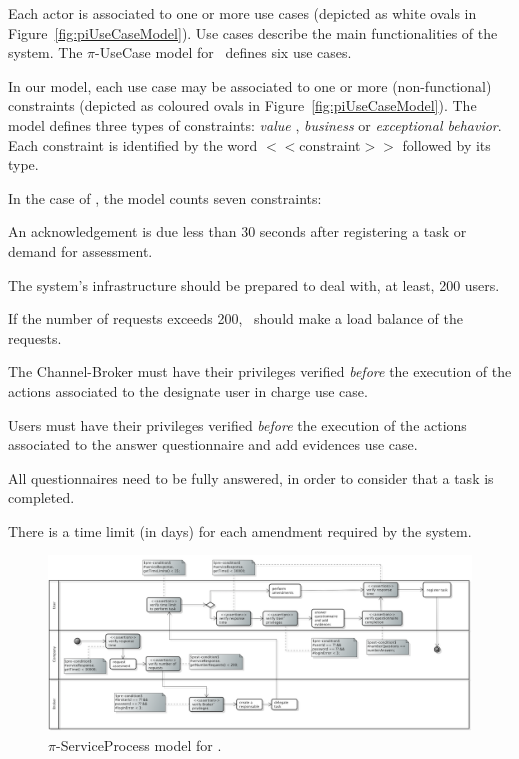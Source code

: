 Each actor is associated to one or more use cases (depicted as white ovals in Figure~\ref{fig:piUseCaseModel}). 
Use cases describe the main functionalities of the system.
The $\pi$-UseCase model for \FlyingPig\ defines six use cases. 

In our model, each use case may be associated to one or more (non-functional) constraints (depicted as coloured ovals in Figure~\ref{fig:piUseCaseModel}). 
The model defines three types of constraints: \textit{value} , \textit{business} or \textit{exceptional behavior}. 
Each constraint is identified by the word $<<$\textsf{constraint}$>>$ followed by its type.

In the case of \FlyingPig, the model counts seven constraints:
\begin{numtrivlist}
\item An acknowledgement is due less than 30 seconds after registering a task or demand for assessment. 
\item The system's infrastructure should be prepared to deal with, at least, 200 users. 
\item If the number of requests exceeds 200, \FlyingPig\ should make a load balance of the requests. 
\item The Channel-Broker must have their privileges verified \textit{before} the execution of the actions associated to the \textsf{designate user in charge} use case.
\item Users must have their privileges verified \textit{before} the execution of the actions associated to the \textsf{answer questionnaire and add evidences} use case.
\item All questionnaires need to be fully answered, in order to consider that a task is completed.
\item There is a time limit (in days) for each amendment required by the system.
\end{numtrivlist}


\begin{figure}
\centering
\includegraphics[width=1.0\textwidth]{figs/ServiceProcessGeneralCut.png}
\caption{$\pi$-ServiceProcess model for \FlyingPig.\label{fig:PiServiceProcessModel}}
\end{figure}

